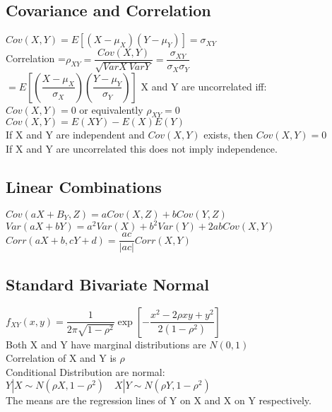 \documentclass{article}
\begin{document}
\begin{flushleft}
\subsection*{Covariance and Correlation}
$Cov(X,Y)=E[(X-\mu_X)(Y-\mu_Y)]=\sigma_{XY}$\\
Correlation =$\rho_{XY}=\dfrac{Cov(X,Y)}{\sqrt{VarX \ VarY}}=\dfrac{\sigma_{XY}}{\sigma_X \sigma_Y}$\\
$=E\left[ \left( \dfrac{X-\mu_X}{\sigma_X} \right) \left( \dfrac{Y-\mu_Y}{\sigma_Y} \right) \right]$\medbreak
X and Y are uncorrelated iff:\\
$Cov(X,Y)=0$ or equivalently $\rho_{XY}=0$\\
$Cov(X,Y)=E(XY)-E(X)E(Y)$\\
If X and Y are independent and $Cov(X,Y)$ exists, then $Cov(X,Y)=0$\\
If X and Y are uncorrelated this does not imply independence.\\
\subsection*{Linear Combinations}
$Cov(aX+B_Y,Z)=aCov(X,Z)+bCov(Y,Z)$\medbreak
$Var(aX+bY)=a^2Var(X)+b^2Var(Y)+2abCov(X,Y)$\medbreak
$Corr(aX+b,cY+d)=\dfrac{ac}{|ac|}Corr(X,Y)$
\subsection*{Standard Bivariate Normal}
$f_{XY}(x,y)=\dfrac{1}{2\pi\sqrt{1-\rho^2}}\exp{\left[-\dfrac{x^2-2\rho xy+y^2}{2(1-\rho^2)}\right]}$\\
Both X and Y have marginal distributions are $N(0,1)$\\
Correlation of X and Y is $\rho$\\
Conditional Distribution are normal:\\
$Y|X \sim N(\rho X,1-\rho^2) \quad X|Y \sim N(\rho Y, 1-\rho^2)$\\
The means are the regression lines of Y on X and X on Y respectively.

\end{flushleft}
\end{document}

